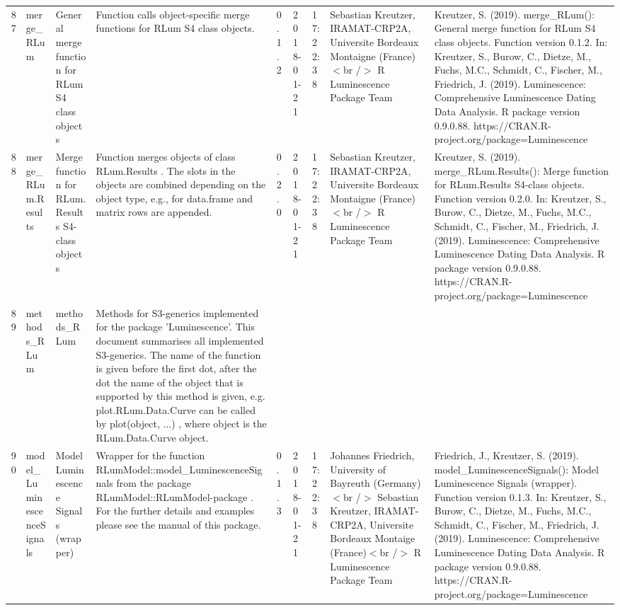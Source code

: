 \begin{table}[ht]
\begin{tabular}{rllllllll}
 \\ 
  87 & merge\_RLum & General merge function for RLum S4 class objects & Function calls object-specific merge functions for RLum S4 class objects. & 0.1.2 & 2018-01-21 & 17:22:38
 & Sebastian Kreutzer, IRAMAT-CRP2A, Universite Bordeaux Montaigne (France)$<$br /$>$  R Luminescence Package Team & Kreutzer, S. (2019). merge\_RLum(): General merge function for RLum S4 class objects. Function version 0.1.2. In: Kreutzer, S., Burow, C., Dietze, M., Fuchs, M.C., Schmidt, C., Fischer, M., Friedrich, J. (2019). Luminescence: Comprehensive Luminescence Dating Data Analysis. R package version 0.9.0.88. https://CRAN.R-project.org/package=Luminescence
 \\ 
  88 & merge\_RLum.Results & Merge function for RLum.Results S4-class objects & Function merges objects of class  RLum.Results . The slots in the objects are combined depending on the object type, e.g., for  data.frame  and  matrix  rows are appended. & 0.2.0 & 2018-01-21 & 17:22:38
 & Sebastian Kreutzer, IRAMAT-CRP2A, Universite Bordeaux Montaigne (France)$<$br /$>$  R Luminescence Package Team & Kreutzer, S. (2019). merge\_RLum.Results(): Merge function for RLum.Results S4-class objects. Function version 0.2.0. In: Kreutzer, S., Burow, C., Dietze, M., Fuchs, M.C., Schmidt, C., Fischer, M., Friedrich, J. (2019). Luminescence: Comprehensive Luminescence Dating Data Analysis. R package version 0.9.0.88. https://CRAN.R-project.org/package=Luminescence
 \\ 
  89 & methods\_RLum & methods\_RLum & Methods for S3-generics implemented for the package 'Luminescence'. This document summarises all implemented S3-generics. The name of the function is given before the first dot, after the dot the name of the object that is supported by this method is given, e.g.  plot.RLum.Data.Curve  can be called by  plot(object, ...) , where  object  is the  RLum.Data.Curve  object. &  &  &  &  &  \\ 
  90 & model\_LuminescenceSignals & Model Luminescence Signals (wrapper) & Wrapper for the function  RLumModel::model\_LuminescenceSignals  from the package RLumModel::RLumModel-package . For the further details and examples please see the manual of this package. & 0.1.3 & 2018-01-21 & 17:22:38
 & Johannes Friedrich, University of Bayreuth (Germany)  $<$br /$>$ Sebastian Kreutzer, IRAMAT-CRP2A, Universite Bordeaux Montaige (France)$<$br /$>$  R Luminescence Package Team & Friedrich, J., Kreutzer, S. (2019). model\_LuminescenceSignals(): Model Luminescence Signals (wrapper). Function version 0.1.3. In: Kreutzer, S., Burow, C., Dietze, M., Fuchs, M.C., Schmidt, C., Fischer, M., Friedrich, J. (2019). Luminescence: Comprehensive Luminescence Dating Data Analysis. R package version 0.9.0.88. https://CRAN.R-project.org/package=Luminescence

\end{tabular}
\end{table}
